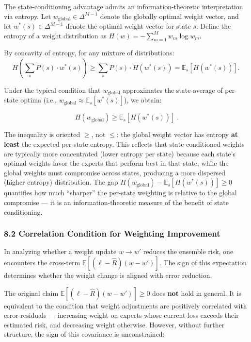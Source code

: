 \documentclass[
  12pt,
]{article}
\begin{document}
The state-conditioning advantage admits an information-theoretic
interpretation via entropy. Let \(w_{\text{global}} \in \Delta^{M-1}\)
denote the globally optimal weight vector, and let
\(w^*(s) \in \Delta^{M-1}\) denote the optimal weight vector for state
\(s\). Define the entropy of a weight distribution as
\(H(w) = -\sum_{m=1}^M w_m \log w_m\).

By concavity of entropy, for any mixture of distributions:
\[H\!\left(\sum_s P(s) \cdot w^*(s)\right) \geq \sum_s P(s) \cdot H(w^*(s)) = \mathbb{E}_s[H(w^*(s))].\]

Under the typical condition that \(w_{\text{global}}\) approximates the
state-average of per-state optima (i.e.,
\(w_{\text{global}} \approx \mathbb{E}_s[w^*(s)]\)), we obtain:

\[\boxed{\;H(w_{\text{global}}) \geq \mathbb{E}_s[H(w^*(s))]\;}.\]

The inequality is oriented \(\geq\), not \(\leq\): the global weight
vector has entropy \textbf{at least} the expected per-state entropy.
This reflects that state-conditioned weights are typically more
concentrated (lower entropy per state) because each state's optimal
weights favor the experts that perform best in that state, while the
global weights must compromise across states, producing a more dispersed
(higher entropy) distribution. The gap
\(H(w_{\text{global}}) - \mathbb{E}_s[H(w^*(s))] \geq 0\) quantifies how
much ``sharper'' the per-state weighting is relative to the global
compromise --- it is an information-theoretic measure of the benefit of
state conditioning.

\subsubsection{8.2 Correlation Condition for Weighting
Improvement}\label{correlation-condition-for-weighting-improvement}

In analyzing whether a weight update \(w \to w'\) reduces the ensemble
risk, one encounters the cross-term
\(\mathbb{E}[(\ell - \hat{R})(w - w')]\). The sign of this expectation determines whether the
weight change is aligned with error reduction.

The original claim \(\mathbb{E}[(\ell - \hat{R})(w - w')] \geq 0\) does
\textbf{not} hold in general. It is equivalent to the condition that
weight adjustments are positively correlated with error residuals ---
increasing weight on experts whose current loss exceeds their estimated
risk, and decreasing weight otherwise. However, without further
structure, the sign of this covariance is unconstrained:
\end{document}

